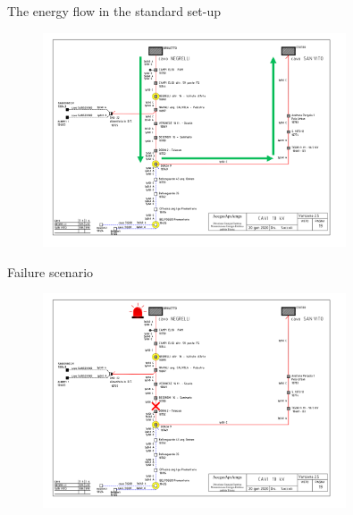 \documentclass[10pt, aspectratio=169, compress, protectframetitle, handout]{beamer}
\begin{document}
\begin{frame}{The energy flow in the standard set-up}
    \vspace{-5pt}
    \begin{figure}
        \centering
        \includegraphics[width=0.8\textwidth]{figures/Rete_TS_2.png}
    \end{figure}
\end{frame}

\begin{frame}{Failure scenario}
    \vspace{-5pt}
    \begin{figure}
        \centering
        \includegraphics[width=0.8\textwidth]{figures/Rete_TS_3.png}
    \end{figure}
\end{frame}
\end{document}
